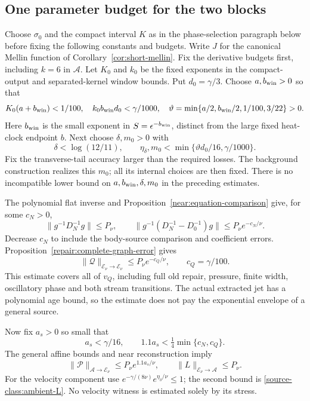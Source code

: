 \subsection{One parameter budget for the two blocks}

Choose $\sigma_0$ and the compact interval $K$ as in the phase-selection
paragraph below before fixing the following constants and budgets.
Write $J$ for the canonical Mellin function of
Corollary~\ref{cor:short-mellin}.
Fix the derivative budgets first, including $k=6$ in $\mathscr A$.
Let $K_0$ and $k_0$ be the fixed exponents in the compact-output and
separated-kernel window bounds. Put $d_0=\gamma/3$. Choose $a,b_{\rm win}>0$
so that
\[
 K_0(a+b_{\rm win})<1/100,\quad k_0b_{\rm win}d_0<\gamma/1000,\quad
 \vartheta=\min\{a/2,b_{\rm win}/2,1/100,3/22\}>0.
\]
Here $b_{\rm win}$ is the small exponent in $S=\epsilon^{-b_{\rm win}}$,
distinct from the large fixed heat-clock endpoint $b$.
Next choose $\delta,m_0>0$ with
\[
 \delta<\log(12/11),\qquad
 \eta_\delta,m_0<\min\{\vartheta d_0/16,\gamma/1000\}.
\]
Fix the transverse-tail accuracy larger than the required losses.
The background construction realizes this $m_0$; all its internal
choices are then fixed. There is no incompatible lower bound on
$a,b_{\rm win},\delta,m_0$ in the preceding estimates.

The polynomial flat inverse and
Proposition~\ref{near:equation-comparison} give, for some $c_N>0$,
\[
 \|g^{-1}D_N^{-1}g\|\le P_\nu,\qquad
 \|g^{-1}(D_N^{-1}-D_0^{-1})g\|\le P_\nu e^{-c_N/\nu}.
\]
Decrease $c_N$ to include the body-source comparison and coefficient
errors. Proposition~\ref{repair:complete-graph-error} gives
\begin{equation}\label{closure:Q-small}
 \|\mathcal Q\|_{\mathcal E_\nu\to\mathcal E_\nu}
       \le P_\nu e^{-c_Q/\nu},\qquad c_Q=\gamma/100.
\end{equation}
This estimate covers all of $v_Q$, including full old repair,
pressure, finite width, oscillatory phase and both stream transitions.
The actual extracted jet has a polynomial age bound, so the estimate
does not pay the exponential envelope of a general source.

Now fix $a_s>0$ so small that
\[
 a_s<\gamma/16,\qquad 1.1a_s<\tfrac14\min\{c_N,c_Q\}.
\]
The general affine bounds and near reconstruction imply
\begin{equation}\label{closure:source-and-extraction}
 \|\mathcal P\|_{\mathscr A\to\mathcal E_\nu}
      \le P_\nu e^{1.1a_s/\nu},\qquad
 \|L\|_{\mathcal E_\nu\to\mathscr A}\le P_\nu .
\end{equation}
For the velocity component use
$e^{-\gamma/(8\nu)}e^{\eta_\delta/\nu}\le1$; the second bound is
\eqref{source-class:ambient-L}. No velocity witness is estimated
solely by its stress.

